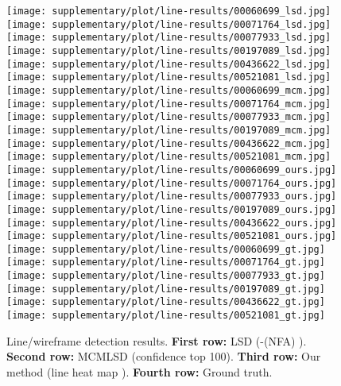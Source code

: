 \documentclass[10pt,twocolumn,letterpaper]{article}
\begin{document}
\begin{figure*}[t]
\texttt{[image: supplementary/plot/line-results/00060699\_lsd.jpg]}
\texttt{[image: supplementary/plot/line-results/00071764\_lsd.jpg]}
\texttt{[image: supplementary/plot/line-results/00077933\_lsd.jpg]}
\texttt{[image: supplementary/plot/line-results/00197089\_lsd.jpg]}
\texttt{[image: supplementary/plot/line-results/00436622\_lsd.jpg]}
\texttt{[image: supplementary/plot/line-results/00521081\_lsd.jpg]}
\\
\texttt{[image: supplementary/plot/line-results/00060699\_mcm.jpg]}
\texttt{[image: supplementary/plot/line-results/00071764\_mcm.jpg]}
\texttt{[image: supplementary/plot/line-results/00077933\_mcm.jpg]}
\texttt{[image: supplementary/plot/line-results/00197089\_mcm.jpg]}
\texttt{[image: supplementary/plot/line-results/00436622\_mcm.jpg]}
\texttt{[image: supplementary/plot/line-results/00521081\_mcm.jpg]}
\\
\texttt{[image: supplementary/plot/line-results/00060699\_ours.jpg]}
\texttt{[image: supplementary/plot/line-results/00071764\_ours.jpg]}
\texttt{[image: supplementary/plot/line-results/00077933\_ours.jpg]}
\texttt{[image: supplementary/plot/line-results/00197089\_ours.jpg]}
\texttt{[image: supplementary/plot/line-results/00436622\_ours.jpg]}
\texttt{[image: supplementary/plot/line-results/00521081\_ours.jpg]}
\\
\texttt{[image: supplementary/plot/line-results/00060699\_gt.jpg]}
\texttt{[image: supplementary/plot/line-results/00071764\_gt.jpg]}
\texttt{[image: supplementary/plot/line-results/00077933\_gt.jpg]}
\texttt{[image: supplementary/plot/line-results/00197089\_gt.jpg]}
\texttt{[image: supplementary/plot/line-results/00436622\_gt.jpg]}
\texttt{[image: supplementary/plot/line-results/00521081\_gt.jpg]}
\\
\caption{Line/wireframe detection results. {\bf First row:} LSD (-(NFA)  ). {\bf Second row:} MCMLSD (confidence top 100). {\bf Third row:} Our method (line heat map ). {\bf Fourth row:} Ground truth.}
\label{fig:line-results-suppl}
\end{figure*} 
\end{document}
